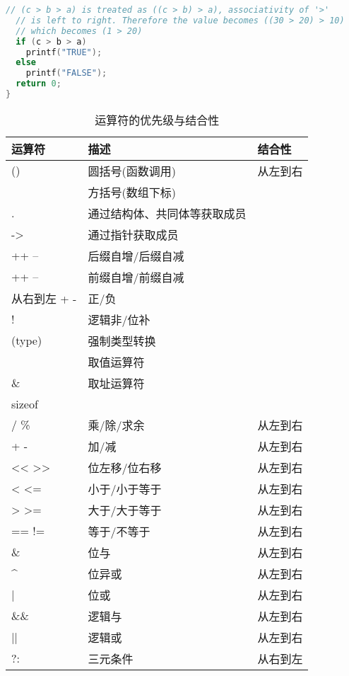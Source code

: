 \documentclass[10pt,a4paper%
tablecaptionabove]{article}
\def\tf{\ttfamily}
\begin{document}
\begin{CJK}{UTF8}{gkai}
\begin{enumerate}
\begin{lstlisting}[language=c,backgroundcolor=\color{red!10}]
  // (c > b > a) is treated as ((c > b) > a), associativity of '>' 
  // is left to right. Therefore the value becomes ((30 > 20) > 10) 
  // which becomes (1 > 20)
  if (c > b > a)  
    printf("TRUE");
  else
    printf("FALSE");
  return 0;
}    
  \end{lstlisting}
\end{enumerate}


\begin{table}[htbp]
  \centering 
  \caption{运算符的优先级与结合性}
  \begin{tabular}{l|l|l}\hline\hline
    运算符 & 描述 & 结合性 \\\hline
    {\tf ()} & 圆括号(函数调用) & 从左到右\\
    {\tf []} & 方括号(数组下标)&  \\
    {\tf .} & 通过结构体、共同体等获取成员&  \\
    {\tf ->} & 通过指针获取成员&  \\
    {\tf ++ -- } & 后缀自增/后缀自减&  \\\hline
    {\tf ++ -- } & 前缀自增/前缀自减&  \\ 从右到左
    {\tf + -} & 正/负 &\\
    {\tf ! ~} & 逻辑非/位补 &\\
    {\tf (type)} & 强制类型转换 &\\
    {\tf *} & 取值运算符&\\
    {\tf \&} & 取址运算符 & \\
    {\tf sizeof} & &\\\hline
    {\tf * / \%} &乘/除/求余 & 从左到右\\\hline
    {\tf + -} & 加/减 & 从左到右\\\hline
    {\tf << >>} & 位左移/位右移 & 从左到右\\\hline
    {\tf < <=} & 小于/小于等于& 从左到右\\
    {\tf > >=} & 大于/大于等于& 从左到右\\\hline
    {\tf == !=} & 等于/不等于& 从左到右\\\hline
    {\tf \&} & 位与 & 从左到右 \\\hline
    {\tf \^{}} & 位异或 & 从左到右 \\\hline
    {\tf |} & 位或 & 从左到右 \\\hline
    {\tf \&\&} & 逻辑与 & 从左到右 \\\hline
    {\tf ||} & 逻辑或 & 从左到右 \\\hline
    {\tf ?:} & 三元条件 & 从右到左 \\\hline

\end{tabular}
\end{table}
\end{CJK}
\end{document}
